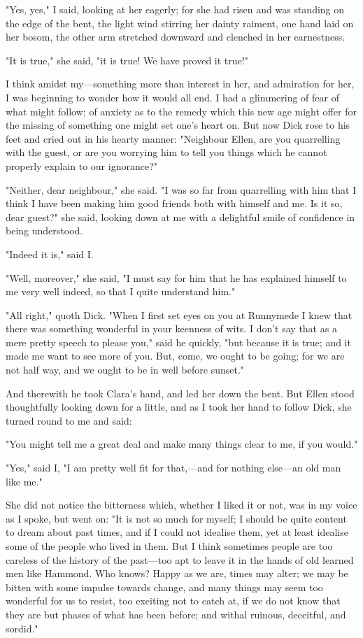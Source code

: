 "Yes, yes," I said, looking at her eagerly; for she had risen and was
standing on the edge of the bent, the light wind stirring her dainty
raiment, one hand laid on her bosom, the other arm stretched downward
and clenched in her earnestness.

"It is true," she said, "it is true! We have proved it true!"

I think amidst my---something more than interest in her, and admiration
for her, I was beginning to wonder how it would all end. I had a
glimmering of fear of what might follow; of anxiety as to the remedy
which this new age might offer for the missing of something one might
set one's heart on. But now Dick rose to his feet and cried out in his
hearty manner: "Neighbour Ellen, are you quarrelling with the guest, or
are you worrying him to tell you things which he cannot properly explain
to our ignorance?"

"Neither, dear neighbour," she said. "I was so far from quarrelling with
him that I think I have been making him good friends both with himself
and me. Is it so, dear guest?" she said, looking down at me with a
delightful smile of confidence in being understood.

"Indeed it is," said I.

"Well, moreover," she said, "I must say for him that he has explained
himself to me very well indeed, so that I quite understand him."

"All right," quoth Dick. "When I first set eyes on you at Runnymede I
knew that there was something wonderful in your keenness of wits. I
don't say that as a mere pretty speech to please you," said he quickly,
"but because it is true; and it made me want to see more of you. But,
come, we ought to be going; for we are not half way, and we ought to be
in well before sunset."

And therewith he took Clara's hand, and led her down the bent. But Ellen
stood thoughtfully looking down for a little, and as I took her hand to
follow Dick, she turned round to me and said:

"You might tell me a great deal and make many things clear to me, if you
would."

"Yes," said I, "I am pretty well fit for that,---and for nothing
else---an old man like me."

She did not notice the bitterness which, whether I liked it or not, was
in my voice as I spoke, but went on: "It is not so much for myself; I
should be quite content to dream about past times, and if I could not
idealise them, yet at least idealise some of the people who lived in
them. But I think sometimes people are too careless of the history of
the past---too apt to leave it in the hands of old learned men like
Hammond. Who knows? Happy as we are, times may alter; we may be bitten
with some impulse towards change, and many things may seem too wonderful
for us to resist, too exciting not to catch at, if we do not know that
they are but phases of what has been before; and withal ruinous,
deceitful, and sordid."

